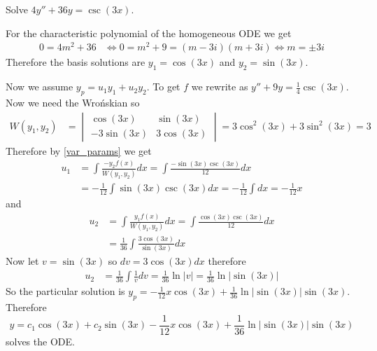 \documentclass[notes]{subfiles}
\begin{document}
\begin{exercise}
    Solve $4y'' + 36y = \csc(3x)$.
\end{exercise}
\begin{solution}
    For the characteristic polynomial of the homogeneous ODE we get
    \begin{align*}
        0 = 4m^2 + 36
        &\iff 0 = m^2 + 9 = (m - 3i)(m + 3i)
        \iff m = \pm 3i
    \end{align*}
    Therefore the basis solutions are $y_1 = \cos(3x)$ and $y_2 = \sin(3x)$.
    
    Now we assume $y_p = u_1y_1 + u_2y_2$. To get $f$ we rewrite as $y'' + 9y = \frac{1}{4}\csc(3x)$. Now we need the Wro\'nskian so
    \begin{align*}
        W(y_1, y_2)
        &= \begin{vmatrix}
            \cos(3x) & \sin(3x) \\
            -3\sin(3x) & 3\cos(3x)
        \end{vmatrix}
        = 3\cos^2(3x) + 3\sin^2(3x)
        = 3
    \end{align*}
    Therefore by \eqref{var_params} we get
    \begin{align*}
        u_1
        &= \int \frac{-y_2f(x)}{W(y_1, y_2)} dx
        = \int \frac{-\sin(3x)\csc(3x)}{12} dx \\
        &= -\frac{1}{12} \int \sin(3x)\csc(3x) dx
        = -\frac{1}{12} \int dx
        = -\frac{1}{12}x
    \end{align*}
    and
    \begin{align*}
        u_2
        &= \int \frac{y_1f(x)}{W(y_1, y_2)} dx
        = \int \frac{\cos(3x)\csc(3x)}{12} dx \\
        &= \frac{1}{36} \int \frac{3\cos(3x)}{\sin(3x)} dx
    \end{align*}
    Now let $v = \sin(3x)$ so $dv = 3\cos(3x)dx$ therefore
    \begin{align*}
        u_2
        &= \frac{1}{36} \int \frac{1}{v} dv
        = \frac{1}{36}\ln|v|
        = \frac{1}{36}\ln\left|\sin(3x)\right|
    \end{align*}
    So the particular solution is $y_p = -\frac{1}{12}x\cos(3x) + \frac{1}{36}\ln\left|\sin(3x)\right|\sin(3x)$. Therefore
    \[
        y = c_1 \cos(3x) + c_2\sin(3x) - \frac{1}{12}x\cos(3x) + \frac{1}{36}\ln\left|\sin(3x)\right|\sin(3x)
    \]
    solves the ODE.
\end{solution}
\end{document}
